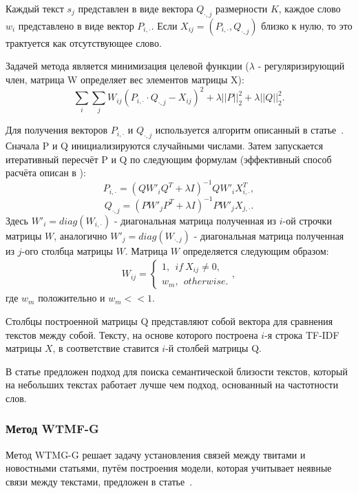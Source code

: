        Каждый текст $s_j$ представлен в виде вектора $Q_{\cdot,j}$ размерности $K$, каждое слово $w_i$ представлено в виде вектор $P_{i,\cdot}$.
        Если $X_{ij}=(P_{i,\cdot}, Q_{\cdot,j})$ близко к нулю, то это трактуется как отсутствующее слово.

        Задачей метода является минимизация целевой функции ($\lambda$ - регуляризирующий член, матрица W определяет вес элементов матрицы X):
        $$\sum_i \sum_j W_{ij} (P_{i,\cdot} \cdot Q_{\cdot,j} - X_{ij})^2 + \lambda ||P||^2_2 + \lambda ||Q||^2_2.$$

        Для получения векторов $P_{i,\cdot}$ и $Q_{\cdot,j}$ используется алгоритм описанный в статье~\cite{matrix_approximation}.
        Сначала P и Q инициализируются случайными числами. Затем запускается итеративный пересчёт P и Q по следующим формулам (эффективный способ расчёта описан в \cite{steck_recommender}):
        $$P_{i, \cdot} = (Q W'_i Q^T + \lambda I)^{-1} Q W'_i X_{i,\cdot}^T,$$
        $$Q_{\cdot, j} = (P W'_j P^T + \lambda I)^{-1} P W'_j X_{j,\cdot}.$$
        Здесь $W'_i = diag(W_{i, \cdot})$ - диагональная матрица полученная из $i$-ой строчки матрицы $W$,
        аналогично $W'_j = diag(W_{\cdot, j})$ - диагональная матрица полученная из $j$-ого столбца матрицы $W$.
        Матрица $W$ определяется следующим образом:
        \begin{gather}
            W_{ij} =
            \begin{cases}
                1, ~~if~X_{ij} \neq 0, \nonumber \\
                w_m, ~~otherwise.
            \end{cases},
        \end{gather}
        где $w_m$ положительно и $w_m << 1$.

        Столбцы построенной матрицы Q представляют собой вектора для сравнения текстов между собой.
        Тексту, на основе которого построена $i$-я строка TF-IDF матрицы $X$, в соответствие ставится $i$-й столбей матрицы Q.

        В статье предложен подход для поиска семантической близости текстов, который на небольших текстах работает лучше чем подход, основанный на частотности слов.

    \subsubsection{Метод WTMF-G}
        Метод WTMG-G решает задачу установления связей между твитами и новостными статьями, путём построения модели, которая учитывает неявные связи между текстами,
         предложен в статье~\cite{linking_base}.

